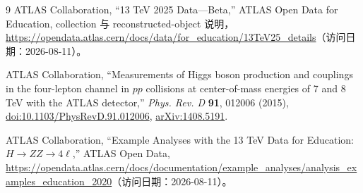\documentclass[11pt,a4paper,fontset=none]{ctexart}
\begin{document}
\small
\begin{thebibliography}{9}
ATLAS Collaboration, ``13 TeV 2025 Data---Beta,'' ATLAS Open Data for Education, collection 与 reconstructed-object 说明，\url{https://opendata.atlas.cern/docs/data/for_education/13TeV25_details}（访问日期：2026-08-11）。

ATLAS Collaboration, ``Measurements of Higgs boson production and couplings in the four-lepton channel in $pp$ collisions at center-of-mass energies of 7 and 8 TeV with the ATLAS detector,'' \emph{Phys. Rev. D} \textbf{91}, 012006 (2015), \href{https://doi.org/10.1103/PhysRevD.91.012006}{doi:10.1103/PhysRevD.91.012006}, \href{https://arxiv.org/abs/1408.5191}{arXiv:1408.5191}.

ATLAS Collaboration, ``Example Analyses with the 13 TeV Data for Education: $H\to ZZ\to4\ell$,'' ATLAS Open Data, \url{https://opendata.atlas.cern/docs/documentation/example_analyses/analysis_examples_education_2020}（访问日期：2026-08-11）。
\end{thebibliography}
\end{document}
